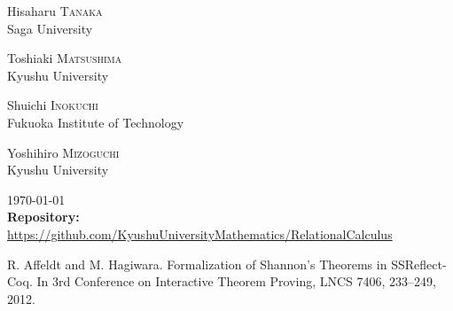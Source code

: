 \documentclass[12pt]{report}
\begin{document}
\begin{titlepage}
\begin{center}
\begin{center}
\begin{minipage}[t]{0.4\textwidth}
\begin{center} 
{\large Hisaharu \textsc{Tanaka}} \\
Saga University
\end{center}
\end{minipage}
\hspace{1cm}
\begin{minipage}[t]{0.4\textwidth}
\begin{center} 
{\large Toshiaki \textsc{Matsushima}} \\
Kyushu University
\end{center}
\end{minipage}
\end{center}
\begin{center}
\begin{minipage}[t]{0.4\textwidth}
\begin{center}
{\large Shuichi \textsc{Inokuchi}} \\
Fukuoka Institute of Technology
\end{center}
\end{minipage}
\hspace{1cm}
\begin{minipage}[t]{0.4\textwidth}
\begin{center} 
{\large Yoshihiro \textsc{Mizoguchi}} \\
Kyushu University
\end{center}
\end{minipage}
\end{center}
\vfill

{\large \today}\\[1cm]
{\footnotesize
{\bf Repository:\ }
\url{https://github.com/KyushuUniversityMathematics/RelationalCalculus}}
\end{center}
\end{titlepage}

\tableofcontents

\setlength{\headheight}{15pt}
\pagestyle{fancy}
\fancyhead{}
\fancyhead[RE]{\rightmark}
\fancyhead[LO]{\leftmark}

















\begin{thebibliography}{99}
R. Affeldt and M. Hagiwara. Formalization of Shannon’s Theorems in SSReflect-Coq. In 3rd Conference on Interactive Theorem Proving, LNCS 7406, 233--249, 2012.
\end{thebibliography}
\end{document}
